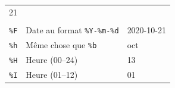 \documentclass[
  11pt,
]{book}
\numberwithin{equation}{section}
\numberwithin{countremarque}{section}
\begin{document}
\begin{longtable}[]{@{}lll@{}}
\begin{minipage}[t]{0.29\columnwidth}
21\strut
\end{minipage}\tabularnewline
\begin{minipage}[t]{0.20\columnwidth}\raggedright
\strut
\end{minipage} & \begin{minipage}[t]{0.42\columnwidth}\raggedright
\strut
\end{minipage} & \begin{minipage}[t]{0.29\columnwidth}\raggedright
\strut
\end{minipage}\tabularnewline
\begin{minipage}[t]{0.20\columnwidth}\raggedright
\texttt{\%F}\strut
\end{minipage} & \begin{minipage}[t]{0.42\columnwidth}\raggedright
Date au format \texttt{\%Y-\%m-\%d}\strut
\end{minipage} & \begin{minipage}[t]{0.29\columnwidth}\raggedright
2020-10-21\strut
\end{minipage}\tabularnewline
\begin{minipage}[t]{0.20\columnwidth}\raggedright
\texttt{\%h}\strut
\end{minipage} & \begin{minipage}[t]{0.42\columnwidth}\raggedright
Même chose que \texttt{\%b}\strut
\end{minipage} & \begin{minipage}[t]{0.29\columnwidth}\raggedright
oct\strut
\end{minipage}\tabularnewline
\begin{minipage}[t]{0.20\columnwidth}\raggedright
\texttt{\%H}\strut
\end{minipage} & \begin{minipage}[t]{0.42\columnwidth}\raggedright
Heure (00--24)\strut
\end{minipage} & \begin{minipage}[t]{0.29\columnwidth}\raggedright
13\strut
\end{minipage}\tabularnewline
\begin{minipage}[t]{0.20\columnwidth}\raggedright
\texttt{\%I}\strut
\end{minipage} & \begin{minipage}[t]{0.42\columnwidth}\raggedright
Heure (01--12)\strut
\end{minipage} & \begin{minipage}[t]{0.29\columnwidth}\raggedright
01\strut
\end{minipage}\tabularnewline

\end{longtable}
\end{document}
